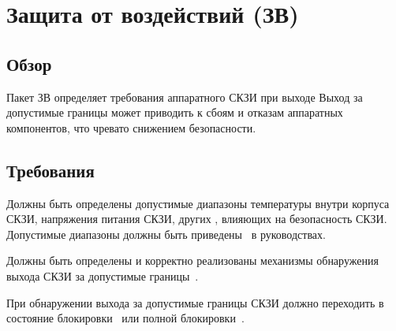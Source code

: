 \section{Защита от воздействий (ЗВ)}\label{EF}

\subsection{Обзор}\label{EF.Intro}

Пакет ЗВ определяет требования  аппаратного СКЗИ при выходе 
%
Выход за допустимые границы может приводить к сбоям и отказам аппаратных 
компонентов, что чревато снижением безопасности.



\subsection{Требования}\label{EF.Reqs}

\label{R.EF.Ranges}
Должны быть определены допустимые диапазоны температуры внутри корпуса СКЗИ, 
напряжения питания СКЗИ, других , 
влияющих на безопасность СКЗИ. Допустимые диапазоны 
должны быть приведены~ в руководствах.

\label{R.EF.Detect}
Должны быть определены и корректно реализованы механизмы 
обнаружения выхода  СКЗИ 
за допустимые границы~. 

\label{R.EF.Lock}
При обнаружении выхода за допустимые границы СКЗИ должно переходить
в состояние блокировки~ или полной 
блокировки~. 
